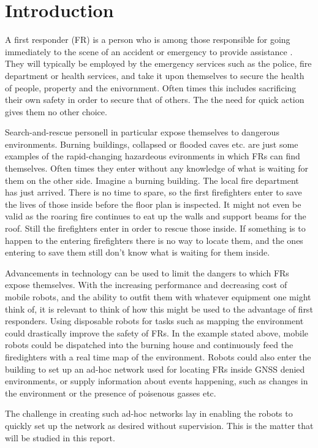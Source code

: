 \section{Introduction}

A first responder (FR) is a person who is among those responsible for going immediately to the scene of an accident or emergency to provide assistance \cite{FR}.
They will typically be employed by the emergency services such as the police, fire department or health services, and take it upon themselves to secure the health of people, property and the enivornment.
Often times this includes sacrificing their own safety in order to secure that of others. The the need for quick action gives them no other choice.

Search-and-rescue personell in particular expose themselves to dangerous environments. Burning buildings, collapsed or flooded caves etc. are just some examples of the rapid-changing
hazardeous evironments in which FRs can find themselves. Often times they enter without any knowledge of what is waiting for them on the other side. Imagine a burning building. The local fire department has just arrived. There is no time to 
spare, so the first firefighters enter to save the lives of those inside before the floor plan is inspected. It might not even be valid as the roaring fire continues to eat up the walls and support beams for the roof. Still the firefighters enter in order to rescue those inside.
If something is to happen to the entering firefighters there is no way to locate them, and the ones entering to save them still don't know what is waiting for them inside.

Advancements in technology can be used to limit the dangers to which FRs expose themselves. With the increasing performance and decreasing cost of mobile robots, and the ability to outfit them with whatever equipment one might think of, it is relevant to think of how 
this might be used to the advantage of first responders. Using disposable robots for tasks such as mapping the environment could drastically improve the safety of FRs. In the example stated above, mobile robots could be dispatched into the burning house
and continuously feed the firedighters with a real time map of the environment. Robots could also enter the building to set up an ad-hoc network \cite{GAVHALE2016477} used for locating FRs inside GNSS denied environments, or supply information about events happening, such as changes in the environment or the
presence of poisenous gasses etc.

The challenge in creating such ad-hoc networks lay in enabling the robots to quickly set up the network as desired without supervision. This is the matter that will be studied in this report.